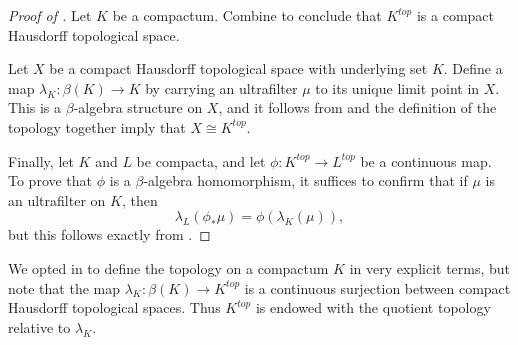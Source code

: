 \begin{proof}[Proof of ]
	Let $ K $ be a compactum.
	Combine  to conclude that $ K^{\textit{top}} $ is a compact Hausdorff topological space.

	Let $ X $ be a compact Hausdorff topological space with underlying set $ K $.
	Define a map $ \lambda_K \colon \beta(K) \to K $ by carrying an ultrafilter $ \mu $ to its unique limit point in $ X $.
	This is a $ \beta $-algebra structure on $ X $, and it follows from  and the definition of the topology together imply that $ X \cong K^{\textit{top}}$.

	Finally, let $ K $ and $ L $ be compacta, and let $ \phi \colon K^{\textit{top}} \to L^{\textit{top}} $ be a continuous map.
	To prove that $ \phi $ is a $ \beta $-algebra homomorphism, it suffices to confirm that if $ \mu $ is an ultrafilter on $ K $, then
	\[
		\lambda_L (\phi_{\ast} \mu) = \phi (\lambda_K(\mu)) \comma
	\]
	but this follows exactly from .
\end{proof}

\begin{nul}
	We opted in  to define the topology on a compactum $ K $ in very explicit terms, but note that the map $ \lambda_K \colon \beta(K) \to K^{\textit{top}} $ is a continuous surjection between compact Hausdorff topological spaces.
	Thus $ K^{\textit{top}} $ is endowed with the quotient topology relative to $ \lambda_K $.
\end{nul}


